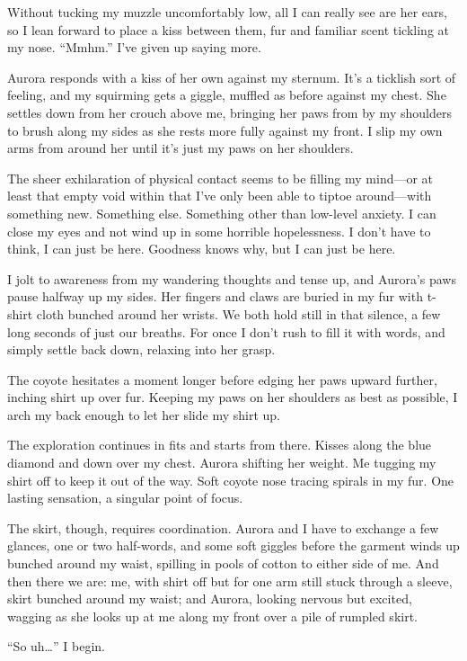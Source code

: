 Without tucking my muzzle uncomfortably low, all I can really see are her ears, so I lean forward to place a kiss between them, fur and familiar scent tickling at my nose. ``Mmhm.'' I've given up saying more.

Aurora responds with a kiss of her own against my sternum. It's a ticklish sort of feeling, and my squirming gets a giggle, muffled as before against my chest. She settles down from her crouch above me, bringing her paws from by my shoulders to brush along my sides as she rests more fully against my front. I slip my own arms from around her until it's just my paws on her shoulders.

The sheer exhilaration of physical contact seems to be filling my mind---or at least that empty void within that I've only been able to tiptoe around---with something new. Something else. Something other than low-level anxiety. I can close my eyes and not wind up in some horrible hopelessness. I don't have to think, I can just be here. Goodness knows why, but I can just be here.

I jolt to awareness from my wandering thoughts and tense up, and Aurora's paws pause halfway up my sides. Her fingers and claws are buried in my fur with t-shirt cloth bunched around her wrists. We both hold still in that silence, a few long seconds of just our breaths. For once I don't rush to fill it with words, and simply settle back down, relaxing into her grasp.

The coyote hesitates a moment longer before edging her paws upward further, inching shirt up over fur. Keeping my paws on her shoulders as best as possible, I arch my back enough to let her slide my shirt up.

The exploration continues in fits and starts from there. Kisses along the blue diamond and down over my chest. Aurora shifting her weight. Me tugging my shirt off to keep it out of the way. Soft coyote nose tracing spirals in my fur. One lasting sensation, a singular point of focus.

The skirt, though, requires coordination. Aurora and I have to exchange a few glances, one or two half-words, and some soft giggles before the garment winds up bunched around my waist, spilling in pools of cotton to either side of me. And then there we are: me, with shirt off but for one arm still stuck through a sleeve, skirt bunched around my waist; and Aurora, looking nervous but excited, wagging as she looks up at me along my front over a pile of rumpled skirt.

``So uh\ldots{}'' I begin.

